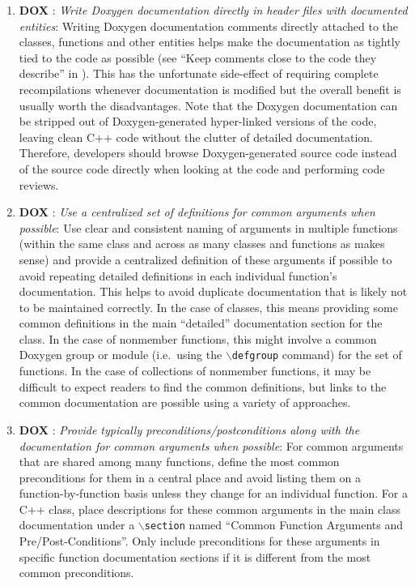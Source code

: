 \begin{enumerate}

{}\item{}\textbf{DOX }:
{}\textit{Write Doxygen documentation directly in header files with documented
entities}: Writing Doxygen documentation comments directly attached to the
classes, functions and other entities helps make the documentation as tightly
tied to the code as possible (see ``Keep comments close to the code they
describe'' in {}\cite[Section 32.5]{CodeComplete2nd04}).  This has the
unfortunate side-effect of requiring complete recompilations whenever
documentation is modified but the overall benefit is usually worth the
disadvantages.  Note that the Doxygen documentation can be stripped out of
Doxygen-generated hyper-linked versions of the code, leaving clean C++ code
without the clutter of detailed documentation.  Therefore, developers should
browse Doxygen-generated source code instead of the source code directly when
looking at the code and performing code reviews.

{}\item{}\textbf{DOX }:
{}\textit{Use a centralized set of definitions for common arguments when
possible}: Use clear and consistent naming of arguments in multiple functions
(within the same class and across as many classes and functions as makes
sense) and provide a centralized definition of these arguments if possible to
avoid repeating detailed definitions in each individual function's
documentation.  This helps to avoid duplicate documentation that is likely not
to be maintained correctly.  In the case of classes, this means providing some
common definitions in the main ``detailed'' documentation section for the
class.  In the case of nonmember functions, this might involve a common
Doxygen group or module (i.e.\ using the {}\texttt{$\backslash$defgroup}
command) for the set of functions.  In the case of collections of nonmember
functions, it may be difficult to expect readers to find the common
definitions, but links to the common documentation are possible using a
variety of approaches.

{}\item{}\textbf{DOX }:
{}\textit{Provide typically preconditions/postconditions along with the
documentation for common arguments when possible}: For common arguments that
are shared among many functions, define the most common preconditions for them
in a central place and avoid listing them on a function-by-function basis
unless they change for an individual function.  For a C++ class, place
descriptions for these common arguments in the main class documentation under
a {}\texttt{$\backslash$section} named ``Common Function Arguments and
Pre/Post-Conditions''.  Only include preconditions for these arguments in
specific function documentation sections if it is different from the most
common preconditions.


\end{enumerate}
